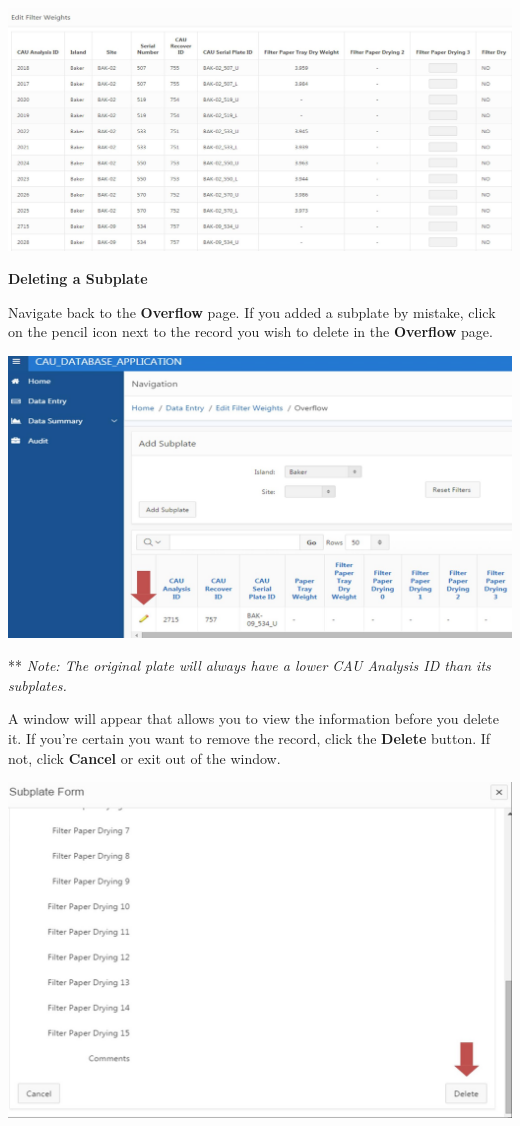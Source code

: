 \documentclass[]{book}
\begin{document}
\includegraphics{images/Data21.jpg}

\textbf{Deleting a Subplate}

Navigate back to the \textbf{Overflow} page. If you added a subplate by mistake, click on the pencil icon next to the record you wish to delete in the \textbf{Overflow} page.

\includegraphics{images/Data22.jpg}

** \emph{Note: The original plate will always have a lower CAU Analysis ID than its subplates.}

A window will appear that allows you to view the information before you delete it. If you're certain you want to remove the record, click the \textbf{Delete} button. If not, click \textbf{Cancel} or exit out of the window.

\includegraphics{images/Data23.jpg}
\end{document}
